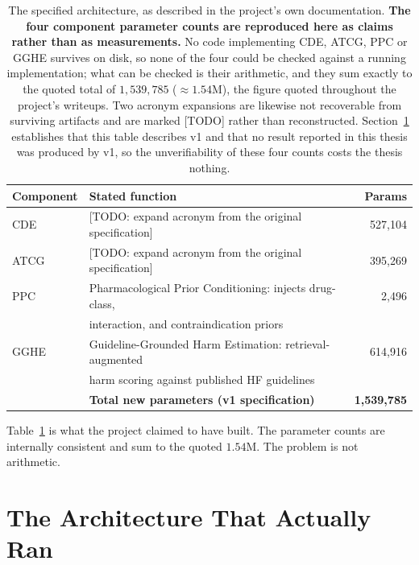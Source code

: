 \begin{table}[t]
\centering
\small
\begin{tabular}{llr}
\toprule
\textbf{Component} & \textbf{Stated function} & \textbf{Params} \\
\midrule
CDE  & [TODO: expand acronym from the original specification] & 527,104 \\
ATCG & [TODO: expand acronym from the original specification] & 395,269 \\
PPC  & Pharmacological Prior Conditioning: injects drug-class, & 2,496 \\
     & interaction, and contraindication priors & \\
GGHE & Guideline-Grounded Harm Estimation: retrieval-augmented & 614,916 \\
     & harm scoring against published HF guidelines & \\
\midrule
     & \textbf{Total new parameters (v1 specification)} & \textbf{1,539,785} \\
\bottomrule
\end{tabular}
\caption{The specified architecture, as described in the project's own
documentation. \textbf{The four component parameter counts are reproduced here
as claims rather than as measurements.} No code implementing CDE, ATCG, PPC or
GGHE survives on disk, so none of the four could be checked against a running
implementation; what can be checked is their arithmetic, and they sum exactly to
the quoted total of $1{,}539{,}785$ ($\approx 1.54$M), the figure quoted
throughout the project's writeups. Two acronym expansions are likewise not
recoverable from surviving artifacts and are marked [TODO] rather than
reconstructed. Section~\ref{sec:actual} establishes that this table describes v1
and that no result reported in this thesis was produced by v1, so the
unverifiability of these four counts costs the thesis nothing.}
\label{tab:spec}
\end{table}

Table~\ref{tab:spec} is what the project claimed to have built. The parameter
counts are internally consistent and sum to the quoted $1.54$M. The problem is
not arithmetic.

\section{The Architecture That Actually Ran}
\label{sec:actual}

